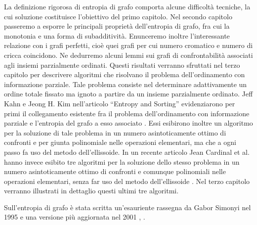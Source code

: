 La definizione rigorosa di entropia di grafo comporta alcune difficoltà tecniche, la cui soluzione costituisce l'obiettivo del primo capitolo. Nel secondo capitolo passeremo a esporre le principali proprietà dell'entropia di grafo, fra cui la monotonia e una forma di subadditività. Enunceremo inoltre l'interessante relazione con i grafi perfetti, cioè quei grafi per cui numero cromatico e numero di cricca coincidono. Ne dedurremo alcuni lemmi sui grafi di confrontabilità associati agli insiemi parzialmente ordinati. Questi risultati verranno sfruttati nel terzo capitolo per descrivere algoritmi che risolvano il problema dell'ordinamento con informazione parziale. Tale problema consiste nel determinare adattivamente un ordine totale fissato ma ignoto a partire da un insieme parzialmente ordinato. Jeff Kahn e Jeong H. Kim nell'articolo ``Entropy and Sorting'' evidenziarono per primi il collegamento esistente fra il problema dell'ordinamento con informazione parziale e l'entropia del grafo a esso associato \cite{Kahn1995}. Essi esibirono inoltre un algoritmo per la soluzione di tale problema in un numero asintoticamente ottimo di confronti e per giunta polinomiale nelle operazioni elementari, ma che a ogni passo fa uso del metodo dell'ellissoide. In un recente articolo Jean Cardinal et al. hanno invece esibito tre algoritmi per la soluzione dello stesso problema in un numero asintoticamente ottimo di confronti e comunque polinomiali nelle operazioni elementari, senza far uso del metodo dell'ellissoide \cite{Cardinal2010}. Nel terzo
capitolo verranno illustrati in dettaglio questi ultimi tre algoritmi.

Sull'entropia di grafo è stata scritta un'esauriente rassegna da Gabor Simonyi nel 1995 e una versione più aggiornata nel 2001 \cite{Simonyi1995}, \cite{Simonyi2001}.
